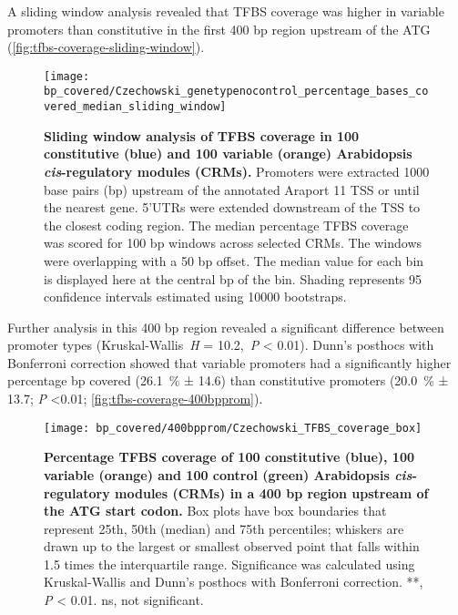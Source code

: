 \documentclass[../main.tex]{subfiles}
\begin{document}
A sliding window analysis revealed that TFBS coverage was higher in variable promoters than constitutive in the first 400 bp region upstream of the ATG (\autoref{fig:tfbs-coverage-sliding-window}).

 \begin{figure}[hbt!]
	\begin{center}
		\capstart
		\texttt{[image: bp\_covered/Czechowski\_genetypenocontrol\_percentage\_bases\_covered\_median\_sliding\_window]}
		\caption{
			\textbf{Sliding window analysis of TFBS coverage in 100 constitutive (blue) and 100 variable (orange) Arabidopsis \textit{cis}\hyp{}regulatory modules (CRMs).}
			Promoters were extracted 1000 base pairs (bp) upstream of the annotated Araport 11 \autocite{chengAraport11CompleteReannotation2017} TSS or until the nearest gene.
			5'UTRs were extended downstream of the TSS to the closest coding region.
			The median percentage TFBS coverage was scored for 100 bp windows across selected CRMs.
			The windows were overlapping with a 50 bp offset.
			The median value for each bin is displayed here at the central bp of the bin.
			Shading represents 95 confidence intervals estimated using 10000 bootstraps.
			\label{fig:tfbs-coverage-sliding-window}
		}
	\end{center}
\end{figure}


Further analysis in this 400 bp region revealed a significant difference between promoter types (Kruskal\hyp{}Wallis~\textit{H} = 10.2,~\textit{P} \textless{} 0.01). Dunn's posthocs with Bonferroni correction showed that variable promoters had a significantly higher percentage bp covered (\SI{26.1}{\percent} ± 14.6) than constitutive promoters (\SI{20.0}{\percent} ± 13.7; \textit{P} \textless 0.01; \autoref{fig:tfbs-coverage-400bpprom}).

\begin{figure}[hbt!]
	\begin{center}
		\capstart
		\texttt{[image: bp\_covered/400bpprom/Czechowski\_TFBS\_coverage\_box]}
		\caption{
			\textbf{Percentage TFBS coverage of 100 constitutive (blue), 100 variable (orange) and 100 control (green) Arabidopsis \textit{cis}\hyp{}regulatory modules (CRMs) in a 400 bp region upstream of the ATG start codon.}
			Box plots have box boundaries that represent 25th, 50th (median) and 75th percentiles; whiskers are drawn up to the largest or smallest observed point that falls within 1.5 times the interquartile range.
			Significance was calculated using Kruskal\hyp{}Wallis and Dunn's posthocs with Bonferroni correction.
			**, \textit{P} \textless{} 0.01. ns, not significant.
			\label{fig:tfbs-coverage-400bpprom}
		}
	\end{center}
\end{figure}
\end{document}
